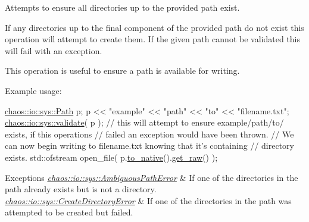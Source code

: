Attempts to ensure all directories up to the provided path exist. 

If any directories up to the final component of the provided path do not exist this operation will attempt to create them. If the given path cannot be validated this will fail with an exception.

This operation is useful to ensure a path is available for writing.

Example usage\+:


\begin{DoxyCode}
\hyperlink{classchaos_1_1io_1_1sys_1_1_path}{chaos::io::sys::Path} p;
p << \textcolor{stringliteral}{"example"} << \textcolor{stringliteral}{"path"} << \textcolor{stringliteral}{"to"} << \textcolor{stringliteral}{"filename.txt"};
\hyperlink{namespacechaos_1_1io_1_1sys_a15e20b105c40cf4d73b13afe87ce1781}{chaos::io::sys::validate}( p );
\textcolor{comment}{// this will attempt to ensure example/path/to/ exists, if this operations}
\textcolor{comment}{// failed an exception would have been thrown.}
\textcolor{comment}{// We can now begin writing to filename.txt knowing that it's containing}
\textcolor{comment}{// directory exists.}
std::ofstream open\_file( p.\hyperlink{classchaos_1_1io_1_1sys_1_1_path_adb68b7589d18dc78f19d9dd6936d9833}{to\_native}().\hyperlink{classchaos_1_1uni_1_1_u_t_f8_string_a91d3bb4cfbfb573b3fa6ecf3312f4dee}{get\_raw}() );
\end{DoxyCode}



\begin{DoxyExceptions}{Exceptions}
{\em \hyperlink{classchaos_1_1io_1_1sys_1_1_ambiguous_path_error}{chaos\+::io\+::sys\+::\+Ambiguous\+Path\+Error}} & If one of the directories in the path already exists but is not a directory. \\
\hline
{\em \hyperlink{classchaos_1_1io_1_1sys_1_1_create_directory_error}{chaos\+::io\+::sys\+::\+Create\+Directory\+Error}} & If one of the directories in the path was attempted to be created but failed. \\
\hline
\end{DoxyExceptions}
